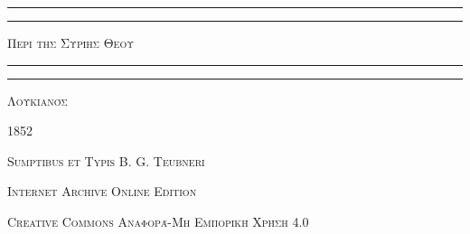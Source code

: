 \documentclass[a4paper, 11pt, oneside, polutonikogreek, german]{article}
\begin{document}
\begin{titlepage} %
	\centering %


	\rule{\textwidth}{1.6pt}\vspace*{-\baselineskip}\vspace*{2pt} %
	\rule{\textwidth}{0.4pt} %
	
	\vspace{1\baselineskip} %
	
	{\scshape\Huge Περι της Συρίης Θεου}
	
	\vspace{1\baselineskip} %

	\rule{\textwidth}{0.4pt}\vspace*{-\baselineskip}\vspace{3.2pt} %
	\rule{\textwidth}{1.6pt} %
	
	\vspace{1\baselineskip} %
	
	
	{\scshape \Large Λουκιανός}
 
        \vspace{0.5\baselineskip}
	
	\vspace*{1\baselineskip} %
	
        {\scshape \normalsize } %

        \vspace*{\fill}    

	\vspace{1\baselineskip}

	{\small\scshape 1852}
	
	{\small\scshape{Sumptibus et Typis B. G. Teubneri}}
	
	\vspace{0.5\baselineskip} %

        \scshape Internet Archive Online Edition%
    
	{\scshape\small Creative Commons Αναφορά-Μη Εμπορική Χρήση 4.0} %
\end{titlepage}
\setlength{\parskip}{1mm plus1mm minus1mm}
\clearpage
\end{document}
